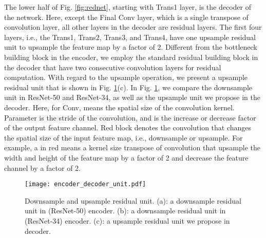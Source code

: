 \documentclass[runningheads]{llncs}
\begin{document}
The lower half of Fig. \ref{fig:rednet}, starting with Trans1 layer, is the decoder of the network. Here, except the Final Conv layer, which is a single  transpose of convolution layer, all other layers in the decoder are residual layers. The first four layers, i.e., the Trans1, Trans2, Trans3, and Trans4, have one upsample residual unit to upsample the feature map by a factor of 2. Different from the bottleneck building block in the encoder, we employ the standard residual building block \cite{he2016deep} in the decoder that have two consecutive  convolution layers for residual computation. With regard to the upsample operation, we present a upsample residual unit that is shown in Fig. \ref{fig:encoder_decoder_unit}(c). In Fig. \ref{fig:encoder_decoder_unit}, we compare the downsample unit in ResNet-50 and ResNet-34, as well as the upsample unit we propose in the decoder. Here, for Conv,  means the spatial size of the convolution kernel. Parameter  is the stride of the convolution, and  is the increase or decrease factor of the output feature channel. Red block denotes the convolution that changes the spatial size of the input feature map, i.e., downsample or upsample. For example, a \mbox{} in red means a  kernel size transpose of convolution that upsample the width and height of the feature map by a factor of 2 and decrease the feature channel by a factor of 2.





\begin{figure}[!t]
    \centering
    \texttt{[image: encoder\_decoder\_unit.pdf]}
    \caption{Downsample and upsample residual unit. (a): a downsample residual unit in (ResNet-50) encoder. (b): a downsample residual unit in (ResNet-34) encoder. (c): a upsample residual unit we propose in decoder.}
    \label{fig:encoder_decoder_unit}
\end{figure}\textbf{}
\end{document}
